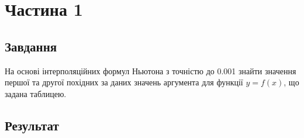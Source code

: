 \section{Частина 1}
\label{sec:task1}

\subsection{Завдання}
\label{subsec:task1_task}

На основі інтерполяційних формул Ньютона з точністю до 0.001
знайти значення першої та другої похідних за даних значень аргумента
для функції $y = f(x)$, що задана таблицею.

\subsection{Результат}
\label{subsec:task1_result}

